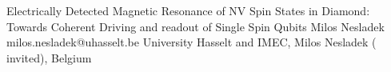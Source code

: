 \begin{conf-abstract}[]
{Electrically Detected Magnetic Resonance of NV Spin States in Diamond: Towards Coherent Driving and readout of Single Spin Qubits}
{\color{blue} Milos Nesladek}
{milos.nesladek@uhasselt.be}
{University Hasselt and IMEC, Milos Nesladek ( invited), Belgium}
{\decofourleft \decofourright}





\printbibliography[heading=none]

\end{conf-abstract}
